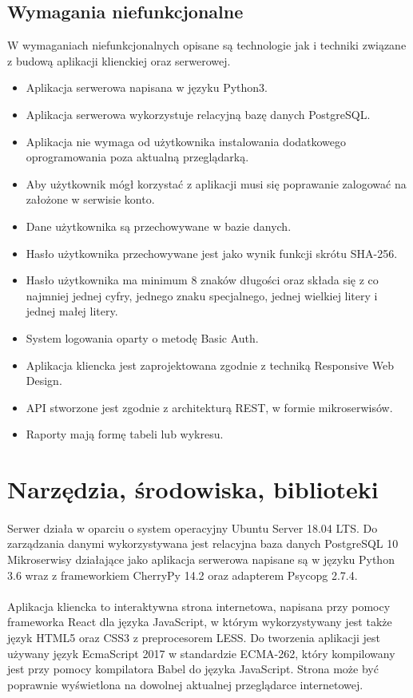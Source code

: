 \documentclass{article}
\begin{document}
	\subsection{Wymagania niefunkcjonalne}
	W wymaganiach niefunkcjonalnych opisane są technologie jak i techniki związane z budową aplikacji klienckiej oraz serwerowej.
	\begin{itemize}
		\item Aplikacja serwerowa napisana w języku Python3.
		\item Aplikacja serwerowa wykorzystuje relacyjną bazę danych PostgreSQL.
		\item Aplikacja nie wymaga od użytkownika instalowania dodatkowego oprogramowania poza aktualną przeglądarką.
		\item Aby użytkownik mógł korzystać z aplikacji musi się poprawanie zalogować na założone w serwisie konto.
		\item Dane użytkownika są przechowywane w bazie danych.
		\item Hasło użytkownika przechowywane jest jako wynik funkcji skrótu SHA-256.
		\item Hasło użytkownika ma minimum 8 znaków długości oraz składa się z co najmniej jednej cyfry, jednego znaku specjalnego, jednej wielkiej litery i jednej małej litery.
		\item System logowania oparty o metodę Basic Auth.
		\item Aplikacja kliencka jest zaprojektowana zgodnie z techniką Responsive Web Design.
		\item API stworzone jest zgodnie z architekturą REST, w formie mikroserwisów.
		\item Raporty mają formę tabeli lub wykresu.
	\end{itemize}
	\section{Narzędzia, środowiska, biblioteki}
	\paragraph{}Serwer działa w oparciu o system operacyjny Ubuntu Server 18.04 LTS.
	Do zarządzania danymi wykorzystywana jest relacyjna baza danych PostgreSQL 10
	Mikroserwisy działające jako aplikacja serwerowa napisane są w języku Python 3.6 wraz z frameworkiem CherryPy 14.2 oraz adapterem Psycopg 2.7.4.
	\paragraph*{} Aplikacja kliencka to interaktywna strona internetowa, napisana przy pomocy frameworka React dla języka JavaScript, w którym wykorzystywany jest także język HTML5 oraz CSS3 z preprocesorem LESS. Do tworzenia aplikacji jest używany język EcmaScript 2017 w standardzie ECMA-262, który kompilowany jest przy pomocy kompilatora Babel do języka JavaScript. Strona może być poprawnie wyświetlona na dowolnej aktualnej przeglądarce internetowej.
\end{document}
